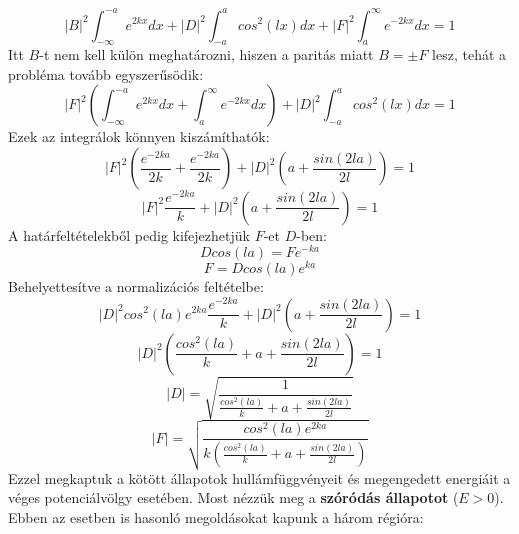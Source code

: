 \documentclass[../main.tex]{subfiles}
\begin{document}
\begin{equation}
    |B|^2 \int_{-\infty}^{-a} e^{2 k x} dx + |D|^2 \int_{-a}^{a} cos^2(l x) dx + |F|^2 \int_{a}^{\infty} e^{-2 k x} dx = 1
\end{equation}
Itt $B$-t nem kell külön meghatározni, hiszen a paritás miatt $B = \pm F$ lesz, tehát a probléma tovább egyszerűsödik:
\begin{equation}
    |F|^2 \left( \int_{-\infty}^{-a} e^{2 k x} dx + \int_{a}^{\infty} e^{-2 k x} dx \right) + |D|^2 \int_{-a}^{a} cos^2(l x) dx = 1
\end{equation}
Ezek az integrálok könnyen kiszámíthatók:
\begin{equation}
    |F|^2 \left( \frac{e^{-2 k a}}{2 k} + \frac{e^{-2 k a}}{2 k} \right) + |D|^2 \left( a + \frac{sin(2 l a)}{2 l} \right) = 1
\end{equation}
\begin{equation}
    |F|^2 \frac{e^{-2 k a}}{k} + |D|^2 \left( a + \frac{sin(2 l a)}{2 l} \right) = 1
\end{equation}
A határfeltételekből pedig kifejezhetjük $F$-et $D$-ben:
\begin{equation}
    D cos(l a) = F e^{- k a}
\end{equation}
\begin{equation}
    F = D cos(l a) e^{k a}
\end{equation}
Behelyettesítve a normalizációs feltételbe:
\begin{equation}
    |D|^2 cos^2(l a) e^{2 k a} \frac{e^{-2 k a}}{k} + |D|^2 \left( a + \frac{sin(2 l a)}{2 l} \right) = 1
\end{equation}
\begin{equation}
    |D|^2 \left( \frac{cos^2(l a)}{k} + a + \frac{sin(2 l a)}{2 l} \right) = 1
\end{equation}
\begin{equation}
    |D| = \sqrt{\frac{1}{\frac{cos^2(l a)}{k} + a + \frac{sin(2 l a)}{2 l}}}
\end{equation}
\begin{equation}
    |F| = \sqrt{\frac{cos^2(l a) e^{2 k a}}{k \left( \frac{cos^2(l a)}{k} + a + \frac{sin(2 l a)}{2 l} \right)}}
\end{equation}
Ezzel megkaptuk a kötött állapotok hullámfüggvényeit és megengedett energiáit a véges potenciálvölgy esetében.
\newline
\newline
Most nézzük meg a \textbf{szóródás állapotot} ($E > 0$). Ebben az esetben is hasonló megoldásokat kapunk a három régióra:
\end{document}
